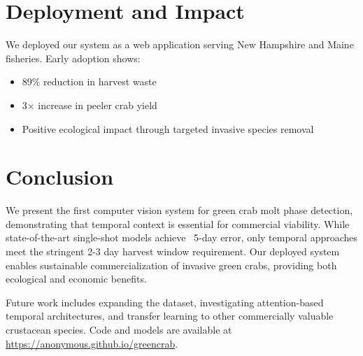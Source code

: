 \documentclass[10pt,twocolumn,letterpaper]{article}
\begin{document}
\section{Deployment and Impact}

We deployed our system as a web application serving New Hampshire and Maine fisheries. Early adoption shows:
\begin{itemize}
\item 89\% reduction in harvest waste
\item 3× increase in peeler crab yield
\item Positive ecological impact through targeted invasive species removal
\end{itemize}

\section{Conclusion}

We present the first computer vision system for green crab molt phase detection, demonstrating that temporal context is essential for commercial viability. While state-of-the-art single-shot models achieve ~5-day error, only temporal approaches meet the stringent 2-3 day harvest window requirement. Our deployed system enables sustainable commercialization of invasive green crabs, providing both ecological and economic benefits.

Future work includes expanding the dataset, investigating attention-based temporal architectures, and transfer learning to other commercially valuable crustacean species. Code and models are available at \url{https://anonymous.github.io/greencrab}.
\end{document}
